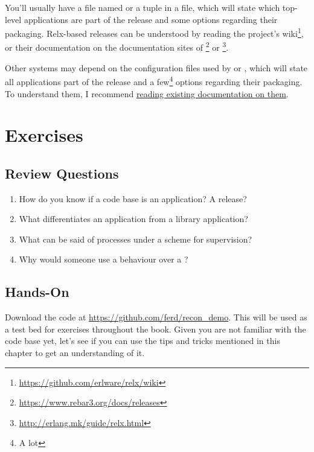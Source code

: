 You'll usually have a file named  or a  tuple in a  file, which will state which top-level applications are part of the release and some options regarding their packaging. Relx-based releases can be understood by reading the project's wiki\footnote{\href{https://github.com/erlware/relx/wiki}{https://github.com/erlware/relx/wiki}}, or their documentation on the documentation sites of \footnote{\href{https://www.rebar3.org/docs/releases}{https://www.rebar3.org/docs/releases}} or \footnote{\href{http://erlang.mk/guide/relx.html}{http://erlang.mk/guide/relx.html}}.

Other systems may depend on the configuration files used by  or , which will state all applications part of the release and a few\footnote{A lot} options regarding their packaging. To understand them, I recommend \href{http://learnyousomeerlang.com/release-is-the-word}{reading existing documentation on them}.

\section{Exercises}

\subsection*{Review Questions}

\begin{enumerate}
	\item How do you know if a code base is an application? A release?
	\item What differentiates an application from a library application?
	\item What can be said of processes under a  scheme for supervision?
	\item Why would someone use a  behaviour over a ?
\end{enumerate}

\subsection*{Hands-On}

Download the code at \href{https://github.com/ferd/recon\_demo}{https://github.com/ferd/recon\_demo}. This will be used as a test bed for exercises throughout the book. Given you are not familiar with the code base yet, let's see if you can use the tips and tricks mentioned in this chapter to get an understanding of it.

